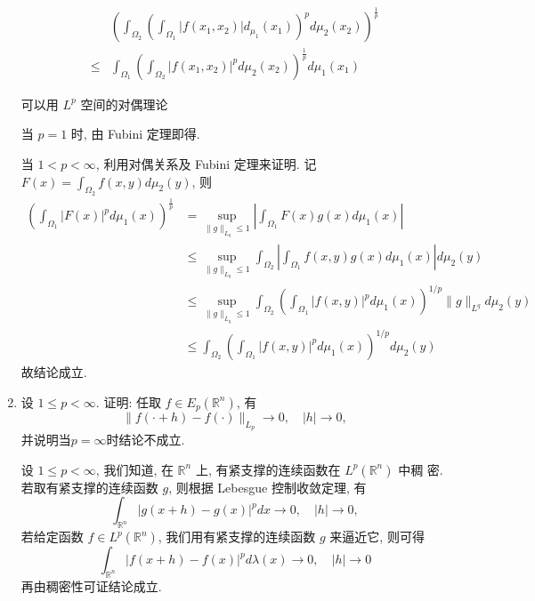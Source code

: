 \begin{enumerate}
    \[
    \begin{aligned}
    &\left(\int_{\Omega_{2}}\left(\int_{\Omega_{1}}\left|f\left(x_{1}, x_{2}\right)\right| d_{\mu _1}\left(x_{1}\right)\right)^{p} d \mu_{2}\left(x_{2}\right)\right)^{\frac{1}{p}} \\
    \leq &\int_{\Omega_{1}}\left(\int_{\Omega_{2}}\left|f\left(x_{1}, x_{2}\right)\right|^{p} d \mu_{2}\left(x_{2}\right)\right)^{\frac{1}{p}} d \mu_{1}\left(x_{1}\right)
    \end{aligned}
    \]
    \begin{hint}
        可以用 $L^{p}$ 空间的对偶理论
    \end{hint}
        \begin{answer}
            当 $p=1$ 时, 由 Fubini 定理即得.

            当 $1<p<\infty$, 利用对偶关系及 Fubini 定理来证明. 记 $F(x)=\int_{\Omega_{2}} f(x, y) d \mu_{2}(y)$,
            则
            \[
                \begin{aligned}
                    \left(\int_{\Omega_{1}}|F(x)|^{p} d \mu_{1}(x)\right)^{\frac{1}{p}} &=\sup _{\|g\|_{L_{q}} \leq 1}\left|\int_{\Omega_{1}} F(x) g(x) d \mu_{1}(x)\right| \\
                    & \leq \sup _{\|g\|_{L_{q}} \leq 1} \int_{\Omega_{2}}\left|\int_{\Omega_{1}} f(x, y) g(x) d \mu_{1}(x)\right| d \mu_{2}(y) \\
                    & \leq \sup _{\|g\|_{L_{q}} \leq 1} \int_{\Omega_{2}}\left(\int_{\Omega_{1}}|f(x, y)|^{p} d \mu_{1}(x)\right)^{1 / p}\|g\|_{L^{q}} d \mu_{2}(y) \\
                    & \leq \int_{\Omega_{2}}\left(\int_{\Omega_{1}}|f(x, y)|^{p} d \mu_{1}(x)\right)^{1 / p} d \mu_{2}(y)
                \end{aligned}
            \]
            故结论成立.
        \end{answer}
    \item 设 $1 \leq p<\infty$. 证明: 任取 $f \in E_{p}\left(\mathbb{R}^{n}\right)$, 有
    \[
    \|f(\cdot+h)-f(\cdot)\|_{L_{p}} \rightarrow 0, \quad|h| \rightarrow 0,
    \]并说明当$p=\infty$时结论不成立.
        \begin{answer}
            设 $1 \leq p<\infty$, 我们知道, 在 $\mathbb{R}^{n}$ 上, 有紧支撑的连续函数在 $L^{p}\left(\mathbb{R}^{n}\right)$ 中稠 密. 若取有紧支撑的连续函数 $g$, 则根据 Lebesgue 控制收敛定理, 有
            \[
            \int_{\mathbb{R}^{n}}|g(x+h)-g(x)|^{p} d x \rightarrow 0, \quad|h| \rightarrow 0,
            \]
            若给定函数 $f \in L^{p}\left(\mathbb{R}^{n}\right)$, 我们用有紧支撑的连续函数 $g$ 来逼近它, 则可得
            \[
            \int_{\mathbb{R}^{n}}|f(x+h)-f(x)|^{p} d \lambda(x) \rightarrow 0, \quad|h| \rightarrow 0
            \]
            再由稠密性可证结论成立.


\end{answer}
\end{enumerate}
